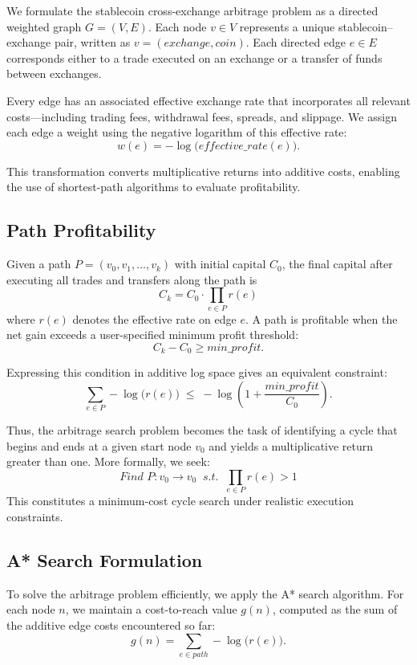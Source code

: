 \documentclass[11pt]{article}
\begin{document}
We formulate the stablecoin cross-exchange arbitrage problem as a directed weighted graph
$G=(V,E)$. Each node $v\in V$ represents a unique stablecoin--exchange pair, written as
$v=(exchange,coin)$. Each directed edge $e\in E$ corresponds either to a trade executed on an
exchange or a transfer of funds between exchanges. 

Every edge has an associated effective exchange rate that incorporates all relevant costs---including trading fees, withdrawal fees, spreads, and slippage. We assign each edge a weight using the negative logarithm of this effective rate:
\[
w(e) = -\log\!\big(\textit{effective\_rate}(e)\big).
\]

This transformation converts multiplicative returns into additive costs, enabling the use of shortest-path algorithms to evaluate profitability.

\subsection{Path Profitability}

Given a path $P=(v_0,v_1,\dots,v_k)$ with initial capital $C_0$, the final capital after executing all trades and transfers along the path is
\[
C_k = C_0 \cdot \prod_{e\in P} r(e)
\]
where $r(e)$ denotes the effective rate on edge $e$. A path is profitable when the net gain exceeds a user-specified minimum profit threshold:
\[
C_k - C_0 \ge \textit{min\_profit}.
\]

Expressing this condition in additive log space gives an equivalent constraint:
\[
\sum_{e\in P} -\log\!\big(r(e)\big)
\;\le\;
-\log\!\left(1+\frac{\textit{min\_profit}}{C_0}\right).
\]

Thus, the arbitrage search problem becomes the task of identifying a cycle that begins and ends at a given start node $v_0$ and yields a multiplicative return greater than one. More formally, we seek:
\[
\textit{Find } P: v_0 \to v_0 \;\; \textit{s.t.}\;\; \prod_{e\in P} r(e) > 1
\]
This constitutes a minimum-cost cycle search under realistic execution constraints.

\subsection{A* Search Formulation}

To solve the arbitrage problem efficiently, we apply the A* search algorithm. For each node $n$, we maintain a cost-to-reach value $g(n)$, computed as the sum of the additive edge costs encountered so far:
\[
g(n) = \sum_{e\in path} -\log\!\big(r(e)\big).
\]
\end{document}

